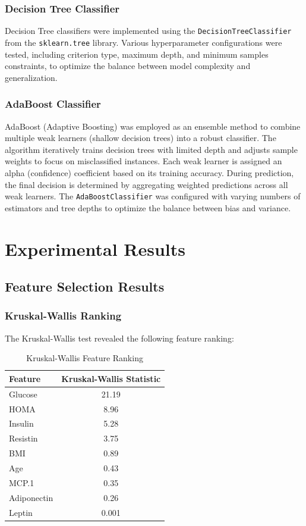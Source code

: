 \documentclass[12pt,a4paper]{article}
\begin{document}
\subsubsection{Decision Tree Classifier}
Decision Tree classifiers were implemented using the \texttt{DecisionTreeClassifier} from the \texttt{sklearn.tree} library. Various hyperparameter configurations were tested, including criterion type, maximum depth, and minimum samples constraints, to optimize the balance between model complexity and generalization.

\subsubsection{AdaBoost Classifier}
AdaBoost (Adaptive Boosting) was employed as an ensemble method to combine multiple weak learners (shallow decision trees) into a robust classifier. The algorithm iteratively trains decision trees with limited depth and adjusts sample weights to focus on misclassified instances. Each weak learner is assigned an alpha (confidence) coefficient based on its training accuracy. During prediction, the final decision is determined by aggregating weighted predictions across all weak learners. The \texttt{AdaBoostClassifier} was configured with varying numbers of estimators and tree depths to optimize the balance between bias and variance.

\section{Experimental Results}
\label{sec:results}

\subsection{Feature Selection Results}
\label{subsec:feature_results}

\subsubsection{Kruskal-Wallis Ranking}
The Kruskal-Wallis test revealed the following feature ranking:

\begin{table}[H]
\centering
\label{tab:kruskal}
        \begin{tabular}{@{}lc@{}}
            	\toprule
            	\textbf{Feature} & \textbf{Kruskal-Wallis Statistic} \\
\midrule
Glucose & 21.19 \\
HOMA & 8.96 \\
Insulin & 5.28 \\
Resistin & 3.75 \\
BMI & 0.89 \\
Age & 0.43 \\
MCP.1 & 0.35 \\
Adiponectin & 0.26 \\
Leptin & 0.001 \\
\bottomrule
\end{tabular}
\caption{Kruskal-Wallis Feature Ranking}
\end{table}
\end{document}
